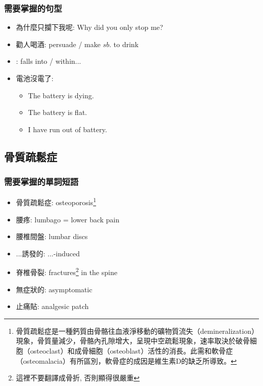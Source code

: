 \subsubsection*{需要掌握的句型}
\begin{multicols}{2}
\begin{itemize}
  \itemsep0em
  \item 為什麼只攔下我呢: Why did you only stop me?
  \item 勸人喝酒: persuade / make $sb.$ to drink
  \item {}: falls into / within...
  \item 電池沒電了:
  \begin{itemize}
  \itemsep0em
  	\item The battery is dying.
  	\item The battery is flat.
  	\item I have run out of battery.
  \end{itemize}
\end{itemize}
\end{multicols}

\subsection{骨質疏鬆症}
\subsubsection*{需要掌握的單詞短語}
\begin{multicols}{2}
\begin{itemize}
  \itemsep0em
  \item 骨質疏鬆症: osteoporosis\footnote{骨質疏鬆症是一種鈣質由骨骼往血液淨移動的礦物質流失（demineralization）現象，骨質量減少，骨骼內孔隙增大，呈現中空疏鬆現象，速率取決於破骨細胞（osteoclast）和成骨細胞（osteoblast）活性的消長。此需和軟骨症（osteomalacia）有所區別，軟骨症的成因是維生素D的缺乏所導致。}
  \item 腰疼: lumbago = lower back pain
  \item 腰椎間盤: lumbar discs
  \item ...誘發的: ...-induced
  \item 脊椎骨裂: fractures\footnote{這裡不要翻譯成骨折, 否則顯得很嚴重} in the spine
  \item 無症狀的: asymptomatic
  \item 止痛貼: analgesic patch
\end{itemize}
\end{multicols}

